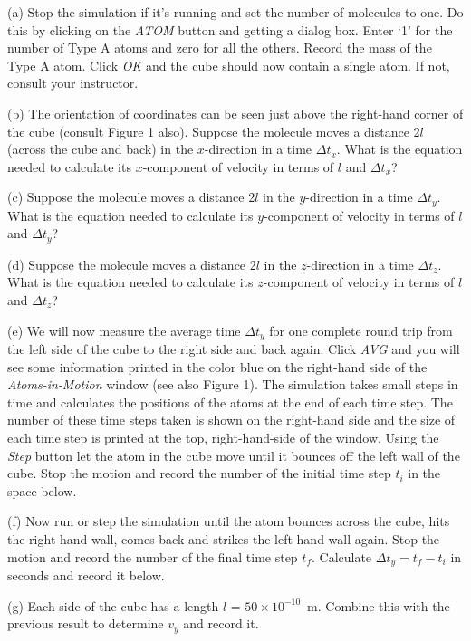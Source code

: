 (a) Stop the simulation if it's running and set the number of molecules to 
one. Do this by clicking on the \textit{ATOM} button and getting a dialog box.
Enter `1' for the
number of Type A atoms and zero for all the others. Record the mass of the
Type A atom. Click \textit{OK} and
the cube should now contain a single atom. If not, consult your instructor.
\answerspace{15mm}

(b) The orientation of coordinates can be seen just above the right-hand corner
of the cube (consult Figure 1 also).
Suppose the molecule moves a distance 2$l$ (across the cube and back) in the $x$-direction in
a time $\Delta t_{x}$. What is the equation needed to calculate
its $x$-component of velocity in terms of $l$ and $\Delta t_{x}$?
\answerspace{15mm}

(c) Suppose the molecule moves a distance 2$l$ in the $y$-direction in
a time $\Delta t_{y}$. What is the equation needed to calculate
its $y$-component of velocity in terms of $l$ and $\Delta t_{y}$?
\answerspace{15mm}

(d) Suppose the molecule moves a distance 2$l$ in the $z$-direction in
a time $\Delta t_{z}$. What is the equation needed to calculate
its $z$-component of velocity in terms of $l$ and $\Delta t_{z}$?
\answerspace{15mm}

(e) We will now measure the average time $\Delta t_y$ for one complete round trip
from the left side of the cube to the right side and back again.
Click \textit{AVG} and you will see some information printed in the color blue
on the right-hand side of the \textit{Atoms-in-Motion} window (see also Figure 1).
The simulation takes small steps in time and calculates the positions of the
atoms at the end of each time step.
The number of these time steps taken is shown on the right-hand side and the size 
of each time step is printed at the top, right-hand-side of the window.
Using the \textit{Step} button let the atom in the cube move until it bounces off the left wall of the cube. Stop the motion and record the number of the initial time step $t_i$ in the space below.
\answerspace{15mm}

(f) Now run or step the simulation until the atom bounces across the cube, hits the right-hand wall, comes back and strikes the left hand wall again. Stop the motion and record the number of the final time step $t_f$.
Calculate $\Delta t_y = t_f - t_i$ in seconds and record it below.
\answerspace{15mm}

(g) Each side of the cube has a length $l$ = $50 \times 10^{-10}$~m.
Combine this with the previous result to determine $v_y$ and record it.
\answerspace{15mm}

